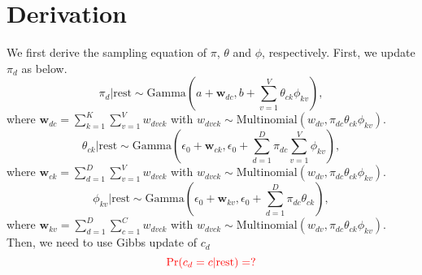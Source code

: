 \documentclass[11pt]{article}
\begin{document}
\section{Derivation}
We first derive the sampling equation of $\pi$, $\theta$ and $\phi$, respectively. 
First, we update $\pi_{d}$ as below.
\begin{equation}
\pi_{d}| \mbox{rest} \sim \mbox{Gamma}(a + \boldsymbol{w}_{dc}, b + \sum_{v=1}^V\theta_{ck}\phi_{kv}),
\end{equation} 
where $\boldsymbol{w}_{dc} = \sum_{k=1}^K\sum_{v=1}^V w_{dvck}$ with $w_{dvck} \sim \mbox{Multinomial}(w_{dv}, \pi_{dc}\theta_{ck}\phi_{kv})$.
\begin{equation}
\theta_{ck}| \mbox{rest} \sim \mbox{Gamma}(\epsilon_0 + \boldsymbol{w}_{ck}, \epsilon_0 + \sum_{d=1}^D\pi_{dc}\sum_{v=1}^V\phi_{kv}),
\end{equation} 
where $\boldsymbol{w}_{ck} = \sum_{d=1}^D\sum_{v=1}^V w_{dvck}$ with $w_{dvck} \sim \mbox{Multinomial}(w_{dv}, \pi_{dc}\theta_{ck}\phi_{kv})$.
\begin{equation}
\phi_{kv}| \mbox{rest} \sim \mbox{Gamma}(\epsilon_0 + \boldsymbol{w}_{kv}, \epsilon_0 +\sum_{d=1}^D\pi_{dc}\theta_{ck} ),
\end{equation} 
where $\boldsymbol{w}_{kv} = \sum_{d=1}^D \sum_{c=1}^C w_{dvck}$ with $w_{dvck} \sim \mbox{Multinomial}(w_{dv},\pi_{dc}\theta_{ck}\phi_{kv})$.\\ \newline
Then, we need to use Gibbs update of $c_d$
\begin{equation}
\textcolor{red}{\Pr(c_d = c| \mbox{rest}) = ?}
\end{equation} 


\iffalse
For tie generating process, we use the current version of the IPTM. For every possible author--recipient pair $(a,r)_{a \neq r}$, we define the ``recipient intensity", which is the likelihood of document $d$ being sent from $a$ to $r$:
\begin{equation}
\lambda_{adr} = {\boldsymbol{b}_{c_d}}^{\top}\boldsymbol{x}_{adrc_d},
\end{equation}
where we place a Normal prior $\boldsymbol{b}_c \sim N(\boldsymbol{\mu}_b, \Sigma_b)$. Similarly, we hypothesize ``If $a$ were the author of document $d$, when would it be sent?" and define the ``timing rate" for author $i$
\begin{equation}
\mu_{ad} = g^{-1}(\boldsymbol{\eta}_{c_d}^\top \boldsymbol{w}_{adc_d}),
\end{equation}
with a Normal prior $\boldsymbol{\eta}_c \sim N(\boldsymbol{\mu}_\eta,\Sigma_\eta)$. We then follow the generalized linear model framework:
\begin{equation}
\begin{aligned}
E(\tau_{ad}) &= \mu_{ad},\\
V(\tau_{ad}) &= V(\mu_{ad}).
\end{aligned}
\end{equation}
\fi
\end{document}
